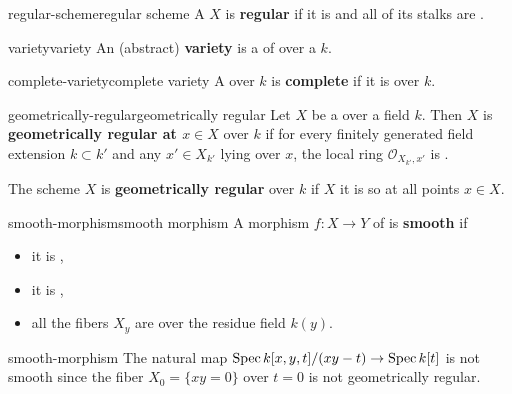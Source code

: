 \begin{topic}{regular-scheme}{regular scheme}
    A  $X$ is \textbf{regular} if it is  and all of its stalks are .
\end{topic}

\begin{topic}{variety}{variety}
    An (abstract) \textbf{variety} is a    of  over a  $k$.
\end{topic}

\begin{topic}{complete-variety}{complete variety}
    A  over $k$ is \textbf{complete} if it is  over $k$.
\end{topic}

\begin{topic}{geometrically-regular}{geometrically regular}
    Let $X$ be a   over a field $k$. Then $X$ is \textbf{geometrically regular at $x \in X$} over $k$ if for every finitely generated field extension $k \subset k'$ and any $x' \in X_{k'}$ lying over $x$, the local ring $\mathcal{O}_{X_{k'}, x'}$ is .
    
    The scheme $X$ is \textbf{geometrically regular} over $k$ if $X$ it is so at all points $x \in X$.
\end{topic}

\begin{topic}{smooth-morphism}{smooth morphism}
    A morphism $f : X \to Y$ of  is \textbf{smooth} if
    \begin{itemize}
        \item it is ,
        \item it is ,
        \item all the fibers $X_y$ are  over the residue field $k(y)$.
    \end{itemize}
\end{topic}

\begin{example}{smooth-morphism}
    The natural map $\operatorname{Spec} k[x, y, t] / (xy - t) \to \operatorname{Spec} k[t]$ is not smooth since the fiber $X_0 = \{ xy = 0 \}$ over $t = 0$ is not geometrically regular.
\end{example}

